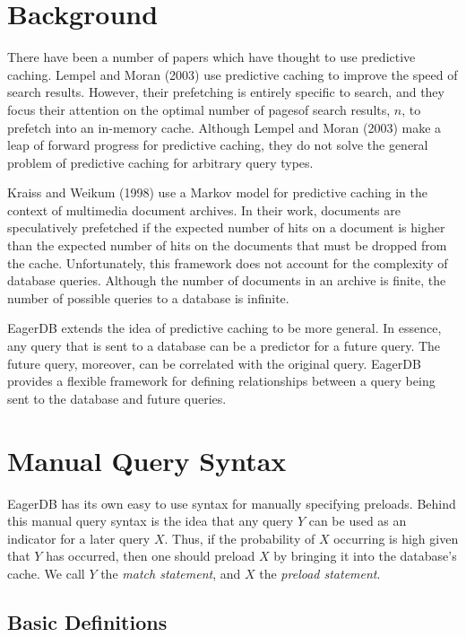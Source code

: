 \documentclass[12pt]{article}
\begin{document}
\section{Background}

There have been a number of papers which have thought to use predictive caching. Lempel and Moran (2003) use predictive caching to improve the speed of search results. However, their prefetching is entirely specific to search, and they focus their attention on the optimal number of pagesof search results, $n$, to prefetch into an in-memory cache. Although Lempel and Moran (2003) make a leap of forward progress for predictive caching, they do not solve the general problem of predictive caching for arbitrary query types.

Kraiss and Weikum (1998) use a Markov model for predictive caching in the context of multimedia document archives. In their work, documents are speculatively prefetched if the expected number of hits on a document is higher than the expected number of hits on the documents that must be dropped from the cache. Unfortunately, this framework does not account for the complexity of database queries. Although the number of documents in an archive is finite, the number of possible queries to a database is infinite.

EagerDB extends the idea of predictive caching to be more general. In essence, any query that is sent to a database can be a predictor for a future query. The future query, moreover, can be correlated with the original query. EagerDB provides a flexible framework for defining relationships between a query being sent to the database and future queries.

\section{Manual Query Syntax}

EagerDB has its own easy to use syntax for manually specifying preloads. Behind this manual query syntax is the idea that any query $Y$ can be used as an indicator for a later query $X$. Thus, if the probability of $X$ occurring is high given that $Y$ has occurred, then one should preload $X$ by bringing it into the database's cache. We call $Y$ the \emph{match statement}, and $X$ the \emph{preload statement}.

\subsection{Basic Definitions}
\end{document}
